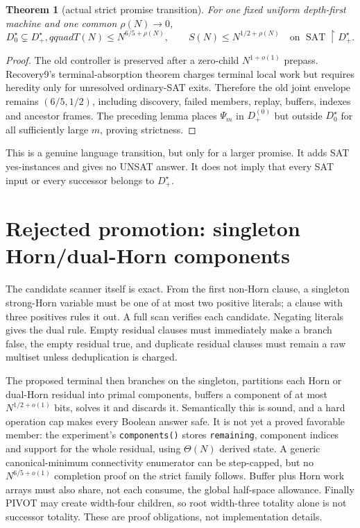 \documentclass[11pt]{article}
\newtheorem{theorem}{Theorem}
\newcommand{\SAT}{\operatorname{SAT}}
\begin{document}
\begin{theorem}[actual strict promise transition]
For one fixed uniform depth-first machine and one common $\rho(N)\to0$,
\[
D_0^\star\subsetneq D_+^\star,qquad
T(N)\le N^{6/5+\rho(N)},\qquad
S(N)\le N^{1/2+\rho(N)}
\quad\text{on }\SAT\!\upharpoonright D_+^\star.
\]
\end{theorem}
\begin{proof}
The old controller is preserved after a zero-child $N^{1+o(1)}$ prepass.
Recovery9's terminal-absorption theorem charges terminal local work but
requires heredity only for unresolved ordinary-SAT exits.  Therefore the old
joint envelope remains $(6/5,1/2)$, including discovery, failed members,
replay, buffers, indexes and ancestor frames.  The preceding lemma places
$\Psi_m$ in $D_+^{(0)}$ but outside $D_0^\star$ for all sufficiently large
$m$, proving strictness.
\end{proof}

This is a genuine language transition, but only for a larger promise.  It
adds SAT yes-instances and gives no UNSAT answer.  It does not imply that
every SAT input or every successor belongs to $D_+^\star$.

\section{Rejected promotion: singleton Horn/dual-Horn components}

The candidate scanner itself is exact.  From the first non-Horn clause, a
singleton strong-Horn variable must be one of at most two positive literals;
a clause with three positives rules it out.  A full scan verifies each
candidate.  Negating literals gives the dual rule.  Empty residual clauses
must immediately make a branch false, the empty residual true, and duplicate
residual clauses must remain a raw multiset unless deduplication is charged.

The proposed terminal then branches on the singleton, partitions each Horn
or dual-Horn residual into primal components, buffers a component of at most
$N^{1/2+o(1)}$ bits, solves it and discards it.  Semantically this is sound,
and a hard operation cap makes every Boolean answer safe.  It is not yet a
proved favorable member: the experiment's \texttt{components()} stores
\texttt{remaining}, component indices and support for the whole residual,
using $\Theta(N)$ derived state.  A generic canonical-minimum connectivity
enumerator can be step-capped, but no $N^{6/5+o(1)}$ completion proof on the
strict family follows.  Buffer plus Horn work arrays must also share, not
each consume, the global half-space allowance.  Finally PIVOT may create
width-four children, so root width-three totality alone is not successor
totality.  These are proof obligations, not implementation details.
\end{document}
